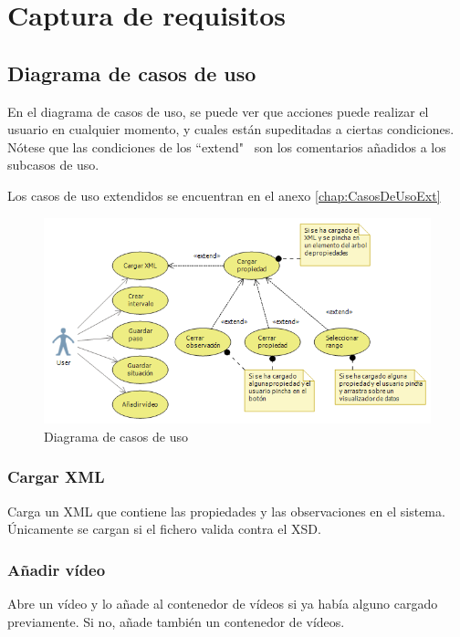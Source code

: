 \chapter{Captura de requisitos}
%

\section{Diagrama de casos de uso}
En el diagrama de casos de uso, se puede ver que acciones puede realizar el usuario en cualquier momento, y cuales
est\'an supeditadas a ciertas condiciones. N\'otese que las condiciones de los ``extend" \ son los comentarios a\~nadidos
a los subcasos de uso.

Los casos de uso extendidos se encuentran en el anexo \ref{chap:CasosDeUsoExt}

\begin{figure}[h]
\centering
\includegraphics[width=1.0\linewidth]{./Figures/useCaseDiagram.png}
\caption[Diagrama de casos de uso]{Diagrama de casos de uso}
\label{fig:useCaseDiagram}
\end{figure}

\subsection{Cargar XML}
Carga un XML que contiene las propiedades y las observaciones en el sistema.
\'Unicamente se cargan si el fichero valida contra el XSD.

\subsection{A\~nadir v\'ideo}
Abre un v\'ideo y lo a\~nade al contenedor de v\'ideos si ya hab\'ia alguno 
cargado previamente. Si no, a\~nade tambi\'en un contenedor de v\'ideos.

